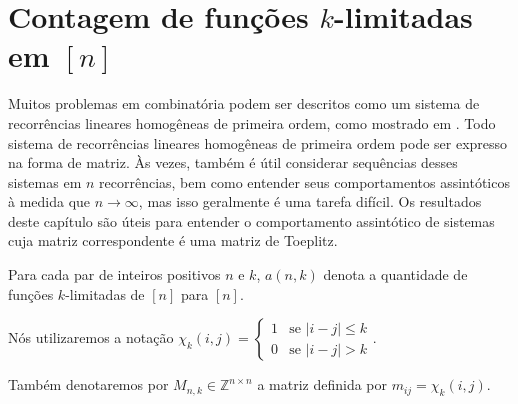\section{Contagem de funções \texorpdfstring{$k$}{k}-limitadas em \texorpdfstring{$[n]$}{[n]}} \vspace{1cm} Muitos problemas em combinatória podem ser descritos como um sistema de recorrências lineares homogêneas de primeira ordem, como mostrado em \cite{coulson}. Todo sistema de recorrências lineares homogêneas de primeira ordem pode ser expresso na forma de matriz. Às vezes, também é útil considerar sequências desses sistemas em $n$ recorrências, bem como entender seus comportamentos assintóticos à medida que $n \to \infty$, mas isso geralmente é uma tarefa difícil. Os resultados deste capítulo são úteis para entender o comportamento assintótico de sistemas cuja matriz correspondente é uma matriz de Toeplitz.

Para cada par de inteiros positivos $n$ e $k$, $a(n,k)$ denota a quantidade de funções $k$-limitadas de $[n]$ para $[n]$.

Nós utilizaremos a notação $\chi_k(i, j) = \begin{cases} 1 & \text{se } \lvert i - j\rvert \le k \\ 0 & \text{se } \lvert i - j\rvert > k \end{cases}$.

Também denotaremos por $M_{n,k} \in \mathbb{Z}^{n \times n}$ a matriz definida por $m_{ij} = \chi_k(i, j)$.


